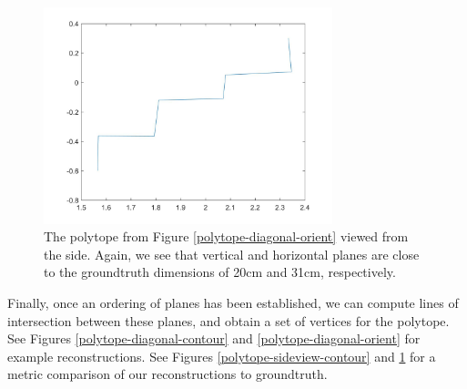 \begin{figure}[!h]
\centering
\includegraphics[width=3.3in]{Sections/Figures/geom_sideview_2d.jpg}
\caption{The polytope from Figure \ref{polytope-diagonal-orient} viewed from the side. Again, we see that vertical and horizontal planes are close to the groundtruth dimensions of 20cm and 31cm, respectively.}
\label{polytope-sideview-orient}
\end{figure}

Finally, once an ordering of planes has been established, we can compute lines of intersection between these planes, and obtain a set of vertices for the polytope. See Figures \ref{polytope-diagonal-contour} and \ref{polytope-diagonal-orient} for example reconstructions. See Figures \ref{polytope-sideview-contour} and \ref{polytope-sideview-orient} for a metric comparison of our reconstructions to groundtruth.
